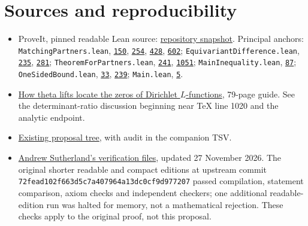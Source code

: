 \documentclass[11pt]{article}
\theoremstyle{remark}\newtheorem{remark}[theorem]{Remark}
\newcommand{\src}[2]{\href{https://github.com/VladimirReshetnikov/ProveIt/blob/ee10f937fedac0955d28b7b860f4c44fab508204/Analysis/GeneralizedRiemannHypothesis/Lean/grh/src/#1\#L#2}{\texttt{#2}}}
\begin{document}
\section*{Sources and reproducibility}
\begin{itemize}
\item ProveIt, pinned readable Lean source: \href{https://github.com/VladimirReshetnikov/ProveIt/tree/ee10f937fedac0955d28b7b860f4c44fab508204/Analysis/GeneralizedRiemannHypothesis/Lean/grh}{repository snapshot}. Principal anchors: \texttt{MatchingPartners.lean}, \src{New/Determinant/Exchange/MatchingPartners.lean}{150}, \src{New/Determinant/Exchange/MatchingPartners.lean}{254}, \src{New/Determinant/Exchange/MatchingPartners.lean}{428}, \src{New/Determinant/Exchange/MatchingPartners.lean}{602}; \texttt{EquivariantDifference.lean}, \src{New/Determinant/Exchange/EquivariantDifference.lean}{235}, \src{New/Determinant/Exchange/EquivariantDifference.lean}{281}; \texttt{TheoremForPartners.lean}, \src{New/Determinant/Exchange/TheoremForPartners.lean}{241}, \src{New/Determinant/Exchange/TheoremForPartners.lean}{1051}; \texttt{MainInequality.lean}, \src{New/Reduction/MainInequality.lean}{87}; \texttt{OneSidedBound.lean}, \src{New/Reduction/OneSidedBound.lean}{33}, \src{New/Reduction/OneSidedBound.lean}{239}; \texttt{Main.lean}, \src{Main.lean}{5}.
\item \href{https://github.com/VladimirReshetnikov/ProveIt/tree/ee10f937fedac0955d28b7b860f4c44fab508204/Analysis/GeneralizedRiemannHypothesis/docs/guide}{How theta lifts locate the zeros of Dirichlet $L$-functions}, 79-page guide. See the determinant-ratio discussion beginning near TeX line 1020 and the analytic endpoint.
\item \href{https://github.com/VladimirReshetnikov/ProveIt/tree/ee10f937fedac0955d28b7b860f4c44fab508204/Analysis/GeneralizedRiemannHypothesis/docs/proposals}{Existing proposal tree}, with audit in the companion TSV.
\item \href{https://math.mit.edu/~drew/shortgrh/}{Andrew Sutherland's verification files}, updated 27 November 2026. The original shorter readable and compact editions at upstream commit \texttt{72fead102f663d5c7a407\allowbreak 964a13dc0cf9d977207} passed compilation, statement comparison, axiom checks and independent checkers; one additional readable-edition run was halted for memory, not a mathematical rejection. These checks apply to the original proof, not this proposal.
\end{itemize}
\end{document}
